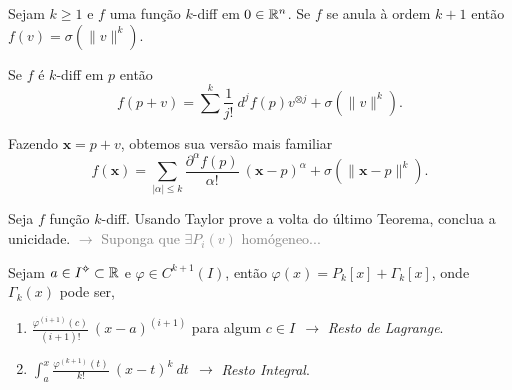 \begin{theorem}
    Sejam \(k\geq 1\) e \(f\) uma função \(k\)-diff em \(0\in \mathbb{R}^n\). Se \(f\) se anula à ordem \(k+1 \) então \(f(v)=\sigma(\|v\|^k)\).
\end{theorem}
\begin{corollary}%
    Se \(f\) é \(k\)-diff em \(p\) então
    \[f(p+v)= \sum^k \frac{1}{j!} \  d^jf(p) v^{\otimes j}  + \sigma(\|v\|^k).\] 
\end{corollary}    
\begin{note}
    Fazendo \(\textbf{x}=p+v\), obtemos sua versão mais familiar  
    \[f(\textbf{x}) = \sum_{|\alpha|\leq k}\frac{\partial^\alpha f (p)}{\alpha !} \ (\textbf{x}-p)^\alpha + \sigma(\|\textbf{x}-p\|^k). \]
\end{note}

\begin{exercise}
    Seja \(f\) função \(k\)-diff. Usando Taylor prove a volta do último Teorema, conclua a unicidade. \textcolor{gray}{\(\rightarrow\) Suponga que \(\exists P_i(v)\) homógeneo... }
\end{exercise}

\Ef 
\begin{proposition}
    Sejam \(a \in I\ab\subset \R\) e \(\varphi \in C^{k+1}(I)\), então \(\varphi (x) = P_k[x] + \Gamma_k[x]\), onde \(\Gamma_k(x) \) pode ser,   
    \begin{enumerate}[label = \roman*.]
        \item \( \frac{\varphi^{(i+1)}(c)}{(i+1)!} \ (x-a)^{(i+1)}\) para algum \(c\in I\ \ \rightarrow \) \emph{Resto de Lagrange}. 
        \item \( \int_a^x \frac{\varphi^{(k+1)}(t)}{k!}\ (x-t)^k\ dt\ \ \rightarrow \)  \emph{Resto Integral}. 
    \end{enumerate} 
\end{proposition}

